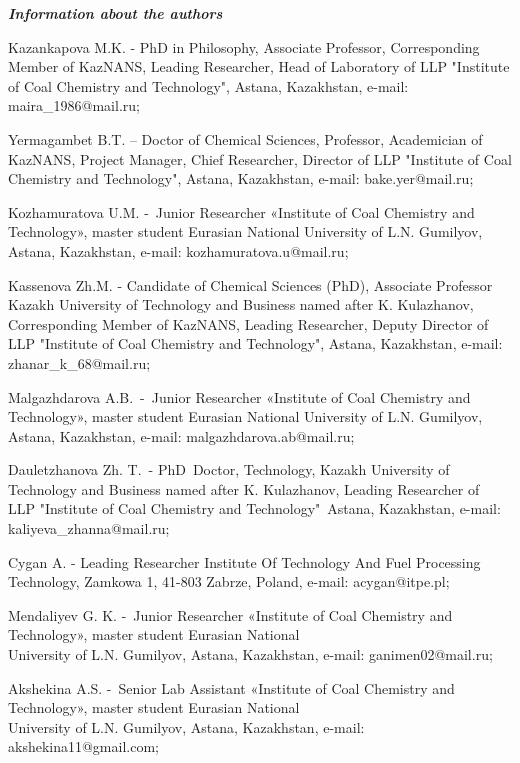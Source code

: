 \begin{authorinfo}
\emph{{\bfseries Information about the authors}}

Kazankapova M.K. - PhD in Philosophy, Associate Professor,
Corresponding Member of KazNANS, Leading Researcher, Head of Laboratory
of LLP "Institute of Coal Chemistry and Technology", Astana, Kazakhstan,
e-mail: maira\_1986@mail.ru;

Yermagambet B.T. -- Doctor of Chemical Sciences, Professor, Academician
of KazNANS, Project Manager, Chief Researcher, Director of LLP
"Institute of Coal Chemistry and Technology", Astana, Kazakhstan,
e-mail: bake.yer@mail.ru;

Kozhamuratova U.M. -~Junior Researcher «Institute of Coal Chemistry and
Technology», master student Eurasian National University of L.N.
Gumilyov, Astana, Kazakhstan, e-mail: kozhamuratova.u@mail.ru;

Kassenova Zh.M. - Candidate of Chemical Sciences (PhD), Associate
Professor Kazakh University of Technology and Business named after K.
Kulazhanov, Corresponding Member of KazNANS, Leading Researcher, Deputy
Director of LLP "Institute of Coal Chemistry and Technology", Astana,
Kazakhstan, e-mail: zhanar\_k\_68@mail.ru;

Malgazhdarova A.B.~-~Junior Researcher «Institute of Coal Chemistry and
Technology», master student Eurasian National University of L.N.
Gumilyov, Astana, Kazakhstan, e-mail: malgazhdarova.ab@mail.ru;

Dauletzhanova Zh. T.~- PhD~Doctor, Technology, Kazakh University of
Technology and Business named after K. Kulazhanov, Leading Researcher
of~ LLP "Institute of Coal Chemistry and Technology"~Astana,
Kazakhstan, e-mail: \\kaliyeva\_zhanna@mail.ru;

Cygan A. - Leading Researcher Institute Of Technology And Fuel
Processing Technology, Zamkowa 1, 41-803 Zabrze, Poland,
e-mail: acygan@itpe.pl;

Mendaliyev G. K. -~Junior Researcher «Institute of Coal Chemistry and
Technology», master student Eurasian National \\University of L.N.
Gumilyov, Astana, Kazakhstan, e-mail: ganimen02@mail.ru;

Akshekina A.S. -~Senior Lab Assistant «Institute of Coal Chemistry and
Technology», master student Eurasian National \\University of L.N.
Gumilyov, Astana, Kazakhstan, e-mail: akshekina11@gmail.com;


\end{authorinfo}
